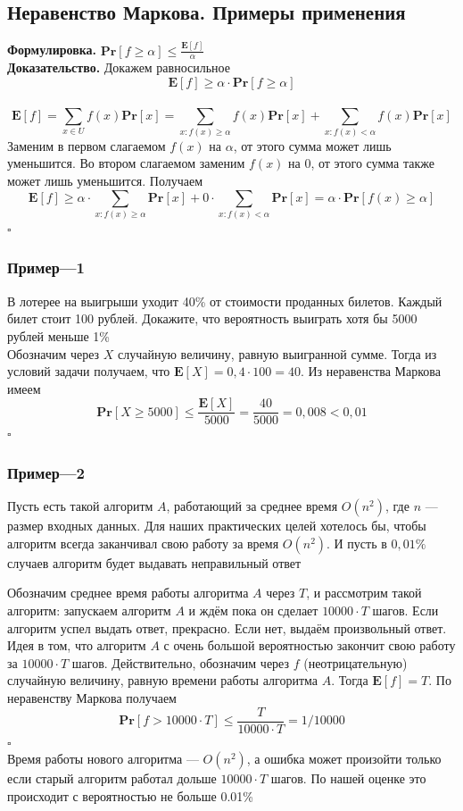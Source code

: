 \documentclass[a4paper]{article}
\newcommand{\qed}{\hfill$\square$}
\begin{document}
\subsection{Неравенство Маркова. Примеры применения}
\textbf{Формулировка.} $\textbf{Pr}[f\geqslant\alpha]\leqslant\displaystyle\frac{\textbf{E}[f]}{\alpha}$\\[4mm]
\indent\textbf{Доказательство.} Докажем равносильное $$\textbf{E}[f]\geqslant\alpha\cdot\textbf{Pr}[f\geqslant\alpha]$$\\
$$\textbf{E}[f]=\displaystyle\sum_{x\in U}f(x)\textbf{Pr}[x]=\displaystyle\sum_{x:f(x)\geqslant\alpha}f(x)\textbf{Pr}[x] +\displaystyle\sum_{x:f(x)<\alpha}f(x)\textbf{Pr}[x]$$
Заменим в первом слагаемом $f(x)$ на $\alpha$, от этого сумма может лишь уменьшится. Во втором слагаемом заменим $f(x)$ на 0, от этого сумма также может лишь уменьшится. Получаем
$$\textbf{E}[f]\geqslant\alpha\cdot\displaystyle\sum_{x:f(x)\geqslant\alpha}\textbf{Pr}[x]+0\cdot\displaystyle\sum_{x:f(x)<\alpha}\textbf{Pr}[x]=\alpha\cdot\textbf{Pr}[f(x)\geqslant\alpha]$$\qed

\subsubsection*{Пример—1}
В лотерее на выигрыши уходит 40\% от стоимости проданных билетов. Каждый билет стоит 100 рублей. Докажите, что вероятность выиграть хотя бы 5000 рублей меньше 1\%\\
Обозначим через $X$ случайную величину, равную выигранной сумме. Тогда из условий задачи получаем, что $\textbf{E}[X] = 0, 4 \cdot 100 = 40$. Из неравенства Маркова имеем
$$\textbf{Pr}[X\geqslant5000]\leqslant\displaystyle\frac{\textbf{E}[X]}{5000}=\displaystyle\frac{40}{5000}=0,008<0,01$$\qed

\subsubsection*{Пример—2}
Пусть есть такой алгоритм $A$, работающий за среднее время $O\left(n^2\right)$, где $n$ — размер входных данных. Для наших практических целей хотелось бы, чтобы алгоритм всегда заканчивал свою работу за время $O\left(n^2\right)$. И пусть в $0,01 \%$ случаев алгоритм будет выдавать неправильный ответ

Обозначим среднее время работы алгоритма $A$ через $T$, и рассмотрим такой алгоритм: запускаем алгоритм $A$ и ждём пока он сделает $10000 \cdot T$ шагов. Если алгоритм успел выдать ответ, прекрасно. Если нет, выдаём произвольный ответ. Идея в том, что алгоритм $A$ с очень большой вероятностью закончит свою работу за $10000 \cdot T$ шагов. Действительно, обозначим через $f$ (неотрицательную) случайную величину, равную времени работы алгоритма $A$. Тогда $\textbf{E}[f]=T$. По неравенству Маркова получаем
$$
\textbf{Pr}[f>10000 \cdot T] \leqslant \frac{T}{10000 \cdot T}=1 / 10000
$$\qed\\[2mm]
Время работы нового алгоритма — $O(n^2)$, а ошибка может произойти только если старый алгоритм работал дольше $10000\cdot T$ шагов. По нашей оценке это происходит с вероятностью не больше 0.01\%
\end{document}
